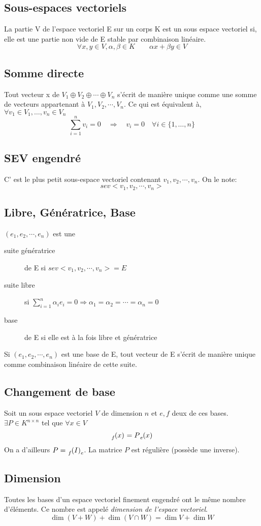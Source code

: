 \subsection{Sous-espaces vectoriels}
La partie V de l'espace vectoriel E sur un corps K est un sous espace vectoriel si, elle est une partie non vide de E stable par combinaison linéaire.\\
\[\forall{x, y} \in V, \alpha, \beta \in K \qquad \alpha x + \beta y \in V\]
\subsection{Somme directe}
Tout vecteur x de $V_1 \oplus V_2 \oplus \cdots \oplus V_n$ s'écrit de manière unique comme une somme de vecteurs appartenant à $V_1, V_2, \cdots , V_n$. Ce qui est équivalent à, $\forall v_1 \in V_1, \ldots, v_n \in V_n$
$$\sum_{i = 1}^{n} v_i = 0\quad\Rightarrow\quad v_i = 0\quad\forall i\in\{1, \ldots, n\}$$
\subsection{SEV engendré}
C' est le plus petit sous-espace vectoriel contenant $v_1, v_2, \cdots ,v_n$.
On le note: \[sev< v_1, v_2, \cdots , v_n >\]
\subsection{Libre, Génératrice, Base}
$(e_1, e_2, \cdots , e_n)$ est une
\begin{description}
\item[suite génératrice] de E si $sev<v_1, v_2, \cdots , v_n> = E$
\item[suite libre] si $\sum_{i = 1}^{n}\alpha_ie_i = 0\Rightarrow \alpha_1 = \alpha_2 = \cdots = \alpha_n = 0$
\item[base] de E si elle est à la fois libre et génératrice
\end{description}
Si $(e_1, e_2, \cdots , e_n)$ est une base de E, tout vecteur de E s'écrit de manière unique comme combinaison linéaire de cette suite.
\subsection{Changement de base}
Soit un sous espace vectoriel $V$ de dimension $n$ et $e, f$ deux de ces bases. $\exists P \in K^{n \times n}$ tel que $\forall x \in V$
\[\tensor*[_f]{(x)}{} = P\tensor*[_e]{(x)}{}\]
On a d'ailleurs $P = \tensor*[_f]{(I)}{_e}$. La matrice $P$ est régulière (possède une inverse).
\subsection{Dimension}
Toutes les bases d'un espace vectoriel finement engendré ont le même nombre d'éléments. Ce nombre est appelé \emph{dimension de l'espace vectoriel}.
\[\dim(V + W)  + \dim(V \cap W) = \dim V + \dim W\]

